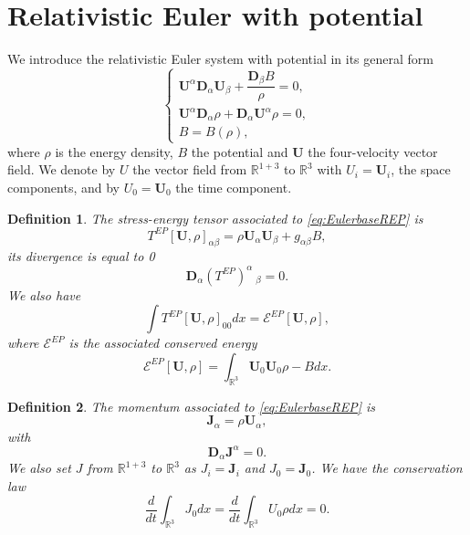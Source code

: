 \documentclass[a4paper, 15pt]{article}
\numberwithin{equation}{section}
\newtheorem{defi}{Definition}[section]
\begin{document}
\section{Relativistic Euler with potential}
\label{section:REP}
We introduce the relativistic Euler system with potential in its general form
\begin{equation}
\label{eq:Eulerbasepotent}
\begin{cases}
\textbf{U}^\alpha\textbf{D}_\alpha \textbf{U}_\beta+\dfrac{\textbf{D}_\beta B}{\rho}=0,\\
\textbf{U}^\alpha\textbf{D}_\alpha \rho+\textbf{D}_\alpha \textbf{U}^\alpha\rho=0,\\
B=B(\rho),
\end{cases}
\end{equation}
where $\rho$ is the energy density, $B$ the potential and $\textbf{U}$ the four-velocity vector field. We denote by $U$ the vector field from $\mathbb{R}^{1+3}$ to $\mathbb{R}^{3}$ with $U_i=\textbf{U}_i$, the space components, and by $U_0=\textbf{U}_0$ the time component. \\
\begin{defi}
\label{defi:energytensorREP}
The stress-energy tensor associated to \eqref{eq:EulerbaseREP} is 
\begin{equation}
\label{eq:stressenergyREP}
    T^{EP}[\textbf{U},\rho]_{\alpha\beta}=\rho \textbf{U}_\alpha \textbf{U}_\beta+g_{\alpha\beta}B,
\end{equation}
its divergence is equal to 0 
\begin{equation}
\label{eq:divstressenergyREP}
    \textbf{D}_\alpha (T^{EP})^{\alpha}~_\beta=0.
\end{equation}
We also have
\begin{equation}
\label{eq:EenergystressenergyREP}
   \int{T^{EP}[\textbf{U},\rho]_{00}dx}=\mathcal{E}^{EP}[\textbf{U},\rho],
\end{equation}
where $\mathcal{E}^{EP}$ is the associated conserved energy
\begin{equation}
\label{eq:EenergyREP}	
	\mathcal{E}^{EP}[\textbf{U},\rho]=\int_{\mathbb{R}^3}{\textbf{U}_0\textbf{U}_0\rho-Bdx}.
\end{equation}
\end{defi}
\begin{defi}
\label{defi:momentumREP}
    The momentum associated to \eqref{eq:EulerbaseREP} is
\begin{equation}
\textbf{J}_\alpha=\rho \textbf{U}_\alpha,
\end{equation}
with
\begin{equation}
\label{eq:momentumREP}
\textbf{D}_\alpha \textbf{J}^\alpha=0.
\end{equation}
We also set $J$ from $\mathbb{R}^{1+3}$ to $\mathbb{R}^{3}$ as  $J_i=\textbf{J}_i$ and $J_0=\textbf{J}_0$. 
   We have the conservation law 
\begin{equation}
\label{eq:conservchargeREP}
	\frac{d}{dt}\int_{\mathbb{R}^3}{J_0dx}=\frac{d}{dt}\int_{\mathbb{R}^3}{U_0\rho dx}=0.
\end{equation} 
\end{defi}
\end{document}
